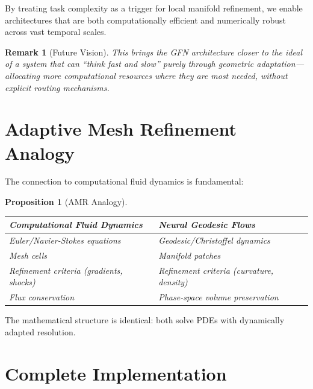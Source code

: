 \documentclass[12pt,letterpaper,twoside]{article}
\newtheorem{remarque}{Remark}[section]
\newtheorem{prop}{Proposition}[section]
\begin{document}
By treating task complexity as a trigger for local manifold refinement, we enable architectures that are both computationally efficient and numerically robust across vast temporal scales.

\begin{remarque}[Future Vision]
This brings the GFN architecture closer to the ideal of a system that can ``think fast and slow'' purely through geometric adaptation---allocating more computational resources where they are most needed, without explicit routing mechanisms.
\end{remarque}

\clearpage

\appendix

\section{Adaptive Mesh Refinement Analogy}

The connection to computational fluid dynamics is fundamental:

\begin{prop}[AMR Analogy]
\begin{center}
\begin{tabular}{p{}p{}}
\toprule
Computational Fluid Dynamics & Neural Geodesic Flows \\ \midrule
Euler/Navier-Stokes equations & Geodesic/Christoffel dynamics \\
Mesh cells & Manifold patches \\
Refinement criteria (gradients, shocks) & Refinement criteria (curvature, density) \\
Flux conservation & Phase-space volume preservation \\ \bottomrule
\end{tabular}
\end{center}
\end{prop}

The mathematical structure is identical: both solve PDEs with dynamically adapted resolution.

\section{Complete Implementation}
\end{document}
